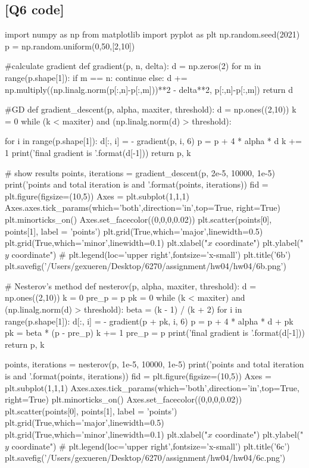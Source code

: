\documentclass[12pt, a4 paper]{article}
\begin{document}
   
    \subsection{[Q6 code]}
        \begin{python} 
import numpy as np
from matplotlib import pyplot as plt
np.random.seed(2021)
p = np.random.uniform(0,50,[2,10])

#calculate gradient
def gradient(p, n, delta):
    d = np.zeros(2)
    for m in range(p.shape[1]):
        if m == n:
            continue
        else:
            d += np.multiply((np.linalg.norm(p[:,n]-p[:,m]))**2 - delta**2, p[:,n]-p[:,m])
    return d

#GD
def gradient_descent(p, alpha, maxiter, threshold):
    d = np.ones((2,10))
    k = 0
    while (k < maxiter) and (np.linalg.norm(d) > threshold):
        
        for i in range(p.shape[1]):
            d[:, i] = - gradient(p, i, 6)
        p = p + 4 * alpha * d
        k += 1
    print('final gradient is {}'.format(d[-1]))
    return p, k

# show results
points, iterations = gradient_descent(p, 2e-5, 10000, 1e-5)
print('points and total iteration is {} and {}'.format(points, iterations))
fid = plt.figure(figsize=(10,5))
Axes = plt.subplot(1,1,1)
Axes.axes.tick_params(which='both',direction='in',top=True, right=True)
plt.minorticks_on()
Axes.set_facecolor((0,0,0,0.02))
plt.scatter(points[0], points[1], label = 'points')
plt.grid(True,which='major',linewidth=0.5)
plt.grid(True,which='minor',linewidth=0.1)
plt.xlabel("$x$ coordinate")
plt.ylabel("$y$ coordinate")
# plt.legend(loc='upper right',fontsize='x-small')
plt.title('6b')
plt.savefig('/Users/gexueren/Desktop/6270/assignment/hw04/hw04/6b.png')

# Nesterov's method
def nesterov(p, alpha, maxiter, threshold):
    d = np.ones((2,10))
    k = 0
    pre_p = p
    pk = 0
    while (k < maxiter) and (np.linalg.norm(d) > threshold):
        beta = (k - 1) / (k + 2)
        for i in range(p.shape[1]):
            d[:, i] = - gradient(p + pk, i, 6)
        p = p + 4 * alpha * d + pk 
        pk = beta * (p - pre_p)
        k += 1
        pre_p = p
    print('final gradient is {}'.format(d[-1]))
    return p, k

points, iterations = nesterov(p, 1e-5, 10000, 1e-5)
print('points and total iteration is {} and {}'.format(points, iterations))
fid = plt.figure(figsize=(10,5))
Axes = plt.subplot(1,1,1)
Axes.axes.tick_params(which='both',direction='in',top=True, right=True)
plt.minorticks_on()
Axes.set_facecolor((0,0,0,0.02))
plt.scatter(points[0], points[1], label = 'points')
plt.grid(True,which='major',linewidth=0.5)
plt.grid(True,which='minor',linewidth=0.1)
plt.xlabel("$x$ coordinate")
plt.ylabel("$y$ coordinate")
# plt.legend(loc='upper right',fontsize='x-small')
plt.title('6c')
plt.savefig('/Users/gexueren/Desktop/6270/assignment/hw04/hw04/6c.png')
        \end{python}
    
\end{document}
